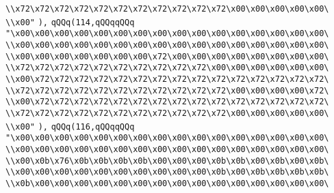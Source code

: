 \verb|\\x72\x72\x72\x72\x72\x72\x72\x72\x72\x72\x72\x00\x00\x00\x00\x00\|\newline
\verb|\\x00"|\newline
\verb|),|\newline
\verb|qQQq(114,qQQqqQQq|\newline
\verb|"\x00\x00\x00\x00\x00\x00\x00\x00\x00\x00\x00\x00\x00\x00\x00\x00\|\newline
\verb|\\x00\x00\x00\x00\x00\x00\x00\x00\x00\x00\x00\x00\x00\x00\x00\x00\|\newline
\verb|\\x00\x00\x00\x00\x00\x00\x00\x72\x00\x00\x00\x00\x00\x00\x00\x00\|\newline
\verb|\\x72\x72\x72\x72\x72\x72\x72\x72\x72\x72\x00\x00\x00\x00\x00\x00\|\newline
\verb|\\x00\x72\x72\x72\x72\x72\x72\x72\x72\x72\x72\x72\x72\x72\x72\x72\|\newline
\verb|\\x72\x72\x72\x72\x72\x72\x72\x72\x72\x72\x72\x00\x00\x00\x00\x72\|\newline
\verb|\\x00\x72\x72\x72\x72\x72\x72\x72\x72\x72\x72\x72\x72\x72\x72\x72\|\newline
\verb|\\x72\x72\x72\x72\x72\x72\x72\x72\x72\x72\x72\x00\x00\x00\x00\x00\|\newline
\verb|\\x00"|\newline
\verb|),|\newline
\verb|qQQq(116,qQQqqQQq|\newline
\verb|"\x00\x00\x00\x00\x00\x00\x00\x00\x00\x00\x00\x00\x00\x00\x00\x00\|\newline
\verb|\\x00\x00\x00\x00\x00\x00\x00\x00\x00\x00\x00\x00\x00\x00\x00\x00\|\newline
\verb|\\x00\x0b\x76\x0b\x0b\x0b\x0b\x00\x00\x00\x0b\x0b\x00\x0b\x00\x0b\|\newline
\verb|\\x00\x00\x00\x00\x00\x00\x00\x00\x00\x00\x0b\x00\x0b\x0b\x0b\x0b\|\newline
\verb|\\x0b\x00\x00\x00\x00\x00\x00\x00\x00\x00\x00\x00\x00\x00\x00\x00\|\newline
